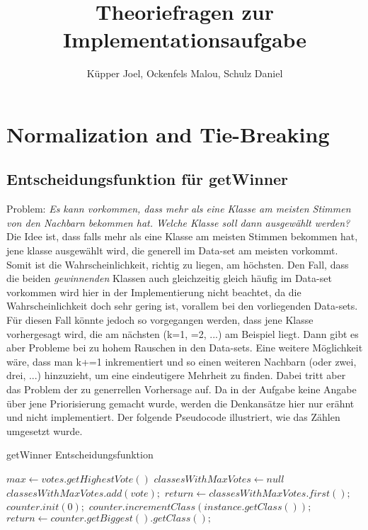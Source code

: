 \documentclass[11pt, oneside]{article}
\title{Theoriefragen zur Implementationsaufgabe}
\author{K\"upper Joel,
Ockenfels Malou,
Schulz Daniel}
\begin{document}
\maketitle

\section{Normalization and Tie-Breaking}
\subsection{Entscheidungsfunktion für getWinner}
Problem: \textit{Es kann vorkommen, dass mehr als eine Klasse am meisten Stimmen von den Nachbarn bekommen hat. Welche Klasse soll dann ausgewählt werden?}
Die Idee ist, dass falls mehr als eine Klasse am meisten Stimmen bekommen hat, jene klasse ausgewählt wird, die generell im Data-set am meisten vorkommt. 
Somit ist die Wahrscheinlichkeit, richtig zu liegen, am höchsten.
Den Fall, dass die beiden \emph{gewinnenden} Klassen auch gleichzeitig gleich häufig im Data-set vorkommen wird hier in der Implementierung nicht beachtet, da die Wahrscheinlichkeit doch sehr gering ist, vorallem bei den vorliegenden Data-sets.\newline
Für diesen Fall könnte jedoch so vorgegangen werden, dass jene Klasse vorhergesagt wird, die am nächsten (k=1, =2, ...) am Beispiel liegt.
Dann gibt es aber Probleme bei zu hohem Rauschen in den Data-sets.\newline
Eine weitere Möglichkeit wäre, dass man k+=1 inkrementiert und so einen weiteren Nachbarn (oder zwei, drei, ...) hinzuzieht, um eine eindeutigere Mehrheit zu finden. 
Dabei tritt aber das Problem der zu generrellen Vorhersage auf. 
Da in der Aufgabe keine Angabe über jene Priorisierung gemacht wurde, werden die Denkansätze hier nur erähnt und nicht implementiert.\newline
Der folgende Pseudocode illustriert, wie das Zählen umgesetzt wurde.

\begin{algorithm}[H]
\caption{getWinner Entscheidungsfunktion}\label{euclid}
\begin{algorithmic}[1]
\State $max \gets votes.getHighestVote()$
\State $classesWithMaxVotes \gets null$
	\State $classesWithMaxVotes.add(vote);$
\EndIf
\EndFor
{}
	\State $return \gets classesWithMaxVotes.first();$
\Else
	\State $counter.init(0);$
			\State $counter.incrementClass(instance.getClass());$
		\EndIf
	\EndFor
\EndIf
\State $return \gets counter.getBiggest().getClass();$

\EndFunction
\end{algorithmic}
\end{algorithm}
\end{document}
